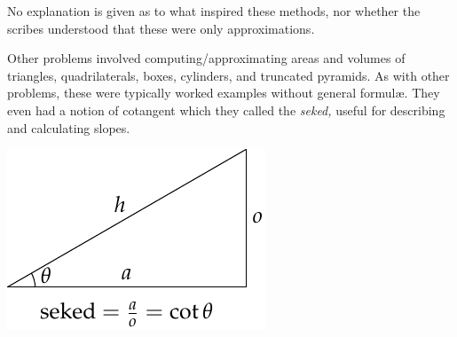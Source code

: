 No explanation is given as to what inspired these methods, nor whether the scribes understood that these were only approximations.\smallbreak
\begin{minipage}[t]{0.67\linewidth}\vspace{0pt}
Other problems involved computing/approximating areas and volumes of triangles, quadrilaterals, boxes, cylinders, and truncated pyramids. As with other problems, these were typically worked examples without general formulæ. They even had a notion of cotangent which they called the \emph{seked,} useful for describing and calculating slopes.
\end{minipage}\hfill\begin{minipage}[t]{0.32\linewidth}\vspace{0pt}
\flushright\includegraphics{geo-01-seked}
\end{minipage}

\goodbreak

